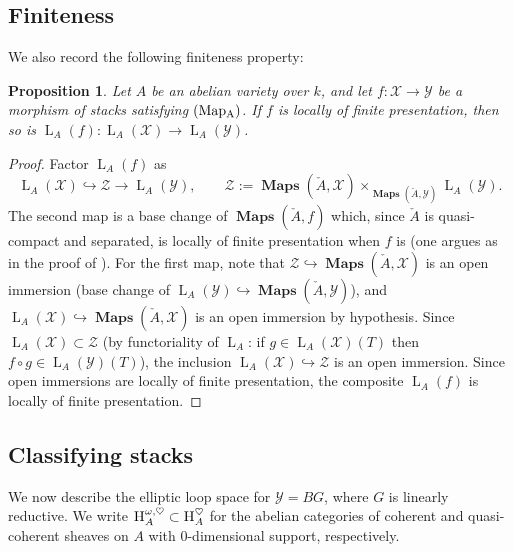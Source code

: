 \documentclass[12pt, oneside]{amsart}
\numberwithin{equation}{section}
\newtheorem{proposition}[subsubsection]{Proposition}
\theoremstyle{remark}
\theoremstyle{plain}
\DeclareMathOperator{\MAP}{\mathbf{Maps}}
\newcommand{\Hcat}{\textup{\textsc{H}}}
\newcommand{\HA}{\Hcat_A}
\newcommand{\Loop}{\operatorname{L}}
\newcommand{\YY}{\mathcal{Y}}
\newcommand{\ZZ}{\mathcal{Z}}
\newcommand{\XX}{\mathcal{X}}
\begin{document}
\subsection{Finiteness}

We also record the following finiteness property:

\begin{proposition}\label{prop:fin pres abvar}
  Let $A$ be an abelian variety over $k$, and let  $f : \XX \to \YY$ be a morphism of stacks satisfying $(\textup{Map}\textsubscript{A})$.
  If $f$ is locally of finite presentation, then so is $\Loop_A(f) : \Loop_A(\XX) \to \Loop_A(\YY)$.
\end{proposition}
\begin{proof}
  Factor $\Loop_A(f)$ as
  \[ \Loop_A(\XX) \hookrightarrow \ZZ \to \Loop_A(\YY), \qquad \ZZ := \MAP(\check{A}, \XX) \times_{\MAP(\check{A}, \YY)} \Loop_A(\YY). \]
  The second map is a base change of $\MAP(\check{A},f)$ which, since $\check{A}$ is quasi-compact and separated, is locally of finite presentation when $f$ is (one argues as in the proof of \cite[Prop.~19.1.3.1(4)]{SAG}).
  For the first map, note that $\ZZ \hookrightarrow \MAP(\check{A}, \XX)$ is an open immersion (base change of $\Loop_A(\YY) \hookrightarrow \MAP(\check{A}, \YY)$), and $\Loop_A(\XX) \hookrightarrow \MAP(\check{A}, \XX)$ is an open immersion by hypothesis.
  Since $\Loop_A(\XX) \subset \ZZ$ (by functoriality of $\Loop_A$: if $g \in \Loop_A(\XX)(T)$ then $f \circ g \in \Loop_A(\YY)(T)$), the inclusion $\Loop_A(\XX) \hookrightarrow \ZZ$ is an open immersion.
  Since open immersions are locally of finite presentation, the composite $\Loop_A(f)$ is locally of finite presentation.
\end{proof}

\subsection{Classifying stacks}\label{ssec:classifying stacks}

We now describe the elliptic loop space for $\YY = BG$, where $G$ is linearly reductive. We write $\HA^{\omega,\heartsuit} \subset \HA^{\heartsuit}$ for the abelian categories of coherent and quasi-coherent sheaves on $A$ with $0$-dimensional support, respectively.

\subsubsection{}
\end{document}
